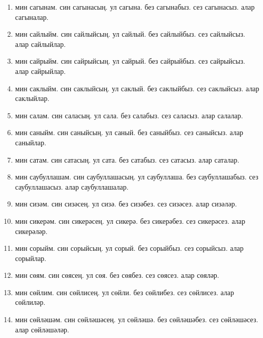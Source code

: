 \documentclass{article}
\begin{document}
\begin{enumerate}
    \item
    мин сагынам.
    син сагынасың.
    ул сагына.
    без сагынабыз.
    сез сагынасыз.
    алар сагыналар.

    \item
    мин сайлыйм.
    син сайлыйсың.
    ул сайлый.
    без сайлыйбыз.
    сез сайлыйсыз.
    алар сайлыйлар.

    \item
    мин сайрыйм.
    син сайрыйсың.
    ул сайрый.
    без сайрыйбыз.
    сез сайрыйсыз.
    алар сайрыйлар.

    \item
    мин саклыйм.
    син саклыйсың.
    ул саклый.
    без саклыйбыз.
    сез саклыйсыз.
    алар саклыйлар.

    \item
    мин салам.
    син саласың.
    ул сала.
    без салабыз.
    сез саласыз.
    алар салалар.

    \item
    мин саныйм.
    син саныйсың.
    ул саный.
    без саныйбыз.
    сез саныйсыз.
    алар саныйлар.

    \item
    мин сатам.
    син сатасың.
    ул сата.
    без сатабыз.
    сез сатасыз.
    алар саталар.

    \item
    мин саубуллашам.
    син саубуллашасың.
    ул саубуллаша.
    без саубуллашабыз.
    сез саубуллашасыз.
    алар саубуллашалар.

    \item
    мин сизәм.
    син сизәсең.
    ул сизә.
    без сизәбез.
    сез сизәсез.
    алар сизәләр.

    \item
    мин сикерәм.
    син сикерәсең.
    ул сикерә.
    без сикерәбез.
    сез сикерәсез.
    алар сикерәләр.

    \item
    мин сорыйм.
    син сорыйсың.
    ул сорый.
    без сорыйбыз.
    сез сорыйсыз.
    алар сорыйлар.

    \item
    мин сөям.
    син сөясең.
    ул сөя.
    без сөябез.
    сез сөясез.
    алар сөяләр.

    \item
    мин сөйлим.
    син сөйлисең.
    ул сөйли.
    без сөйлибез.
    сез сөйлисез.
    алар сөйлиләр.

    \item
    мин сөйләшәм.
    син сөйләшәсең.
    ул сөйләшә.
    без сөйләшәбез.
    сез сөйләшәсез.
    алар сөйләшәләр.


\end{enumerate}
\end{document}
